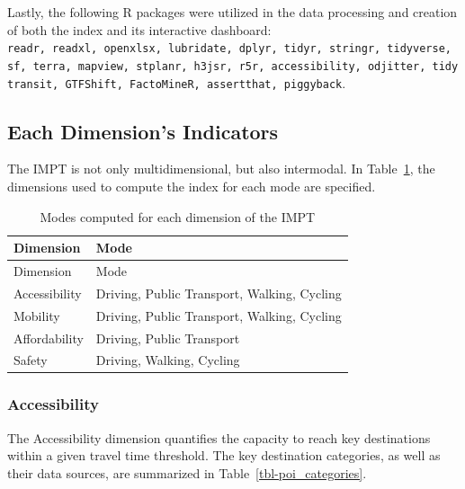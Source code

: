 \documentclass[
  authoryear,
  review,
  1p]{elsarticle}
\begin{document}
Lastly, the following R packages were utilized in the data processing
and creation of both the index and its interactive dashboard:
\texttt{readr,\ readxl,\ openxlsx,\ lubridate,\ dplyr,\ tidyr,\ stringr,\ tidyverse,\ sf,\ terra,\ mapview,\ stplanr,\ h3jsr,\ r5r,\ accessibility,\ odjitter,\ tidytransit,\ GTFShift,\ FactoMineR,\ assertthat,\ piggyback}.

\subsection{Each Dimension's Indicators}\label{sec-MET_indicators}

The IMPT is not only multidimensional, but also intermodal. In
Table~\ref{tbl-modes_per_dimension}, the dimensions used to compute the
index for each mode are specified.

\begin{longtable}[]{@{}ll@{}}
\caption{Modes computed for each dimension of the
IMPT}\label{tbl-modes_per_dimension}\tabularnewline
\toprule\noalign{}
Dimension & Mode \\
\midrule\noalign{}
\endfirsthead
\toprule\noalign{}
Dimension & Mode \\
\midrule\noalign{}
\endhead
\bottomrule\noalign{}
\endlastfoot
Accessibility & Driving, Public Transport, Walking, Cycling \\
Mobility & Driving, Public Transport, Walking, Cycling \\
Affordability & Driving, Public Transport \\
Safety & Driving, Walking, Cycling \\
\end{longtable}

\subsubsection{Accessibility}\label{sec-MET_accessibility}

The Accessibility dimension quantifies the capacity to reach key
destinations within a given travel time threshold. The key destination
categories, as well as their data sources, are summarized in
Table~\ref{tbl-poi_categories}.
\end{document}

